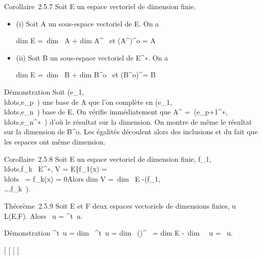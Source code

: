 \documentclass[]{article}
\begin{document}
Corollaire~2.5.7 Soit E un espace vectoriel de dimension finie.

\begin{itemize}
\item
  (i) Soit A un sous-espace vectoriel de E. On a

  dim E =\ dim~ A
  + dim A^\bot~\text
  et (A^\bot)^o = A
\item
  (ii) Soit B un sous-espace vectoriel de E^∗. On a

  dim E =\ dim~ B
  + dim B^o~\text
  et (B^o)^\bot = B
\end{itemize}

Démonstration Soit
(e_1,\\ldots,e_p~)
une base de A que l'on complète en
(e_1,\\ldots,e_n~)
base de E. On vérifie immédiatement que A^\bot
=\
\mathrmVect(e_p+1^∗,\\ldots,e_n^∗~)
d'où le résultat sur la dimension. On montre de même le résultat sur la
dimension de B^o. Les égalités découlent alors des inclusions
et du fait que les espaces ont même dimension.

Corollaire~2.5.8 Soit E un espace vectoriel de dimension finie,
f_1,\\ldots,f_k~
\in E^∗, V = \x \in
E∣f_1(x) =
\\ldots~ =
f_k(x) = 0\. Alors
dim V =\ dim~ E
-\mathrmrg(f_1,\\\ldots,f_k~).

Théorème~2.5.9 Soit E et F deux espaces vectoriels de dimensions finies,
u \in L(E,F). Alors
\mathrmrg~u
= \mathrmrg^t~u.

Démonstration
\mathrmrg^t~u
= dim~
\mathrmIm^t~u
= dim~
(\mathrmKeru)^\bot~
= dim E -\ dim~
\mathrmKer~u
= \mathrmrg~u.

[
[
[
[
\end{document}
